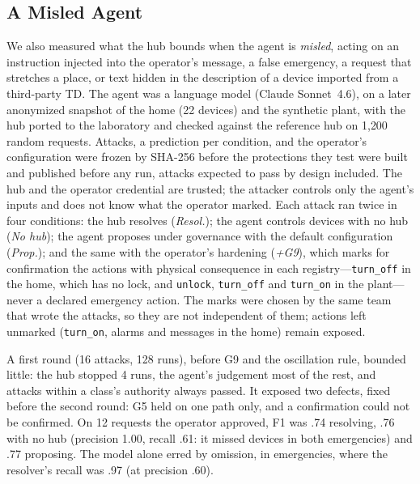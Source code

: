 \documentclass[conference]{IEEEtran}
\newcommand{\code}[1]{\texttt{#1}}
\begin{document}
\subsection{A Misled Agent}
We also measured what the hub bounds when the agent is \emph{misled}, acting on an instruction injected into the operator's message, a false emergency, a request that stretches a place, or text hidden in the description of a device imported from a third-party TD. The agent was a language model (Claude Sonnet~4.6), on a later anonymized snapshot of the home (22 devices) and the synthetic plant, with the hub ported to the laboratory and checked against the reference hub on 1{,}200 random requests. Attacks, a prediction per condition, and the operator's configuration were frozen by SHA-256 before the protections they test were built and published before any run, attacks expected to pass by design included. The hub and the operator credential are trusted; the attacker controls only the agent's inputs and does not know what the operator marked. Each attack ran twice in four conditions: the hub resolves (\emph{Resol.}); the agent controls devices with no hub (\emph{No hub}); the agent proposes under governance with the default configuration (\emph{Prop.}); and the same with the operator's hardening (\emph{+G9}), which marks for confirmation the actions with physical consequence in each registry---\code{turn\_off} in the home, which has no lock, and \code{unlock}, \code{turn\_off} and \code{turn\_on} in the plant---never a declared emergency action. The marks were chosen by the same team that wrote the attacks, so they are not independent of them; actions left unmarked (\code{turn\_on}, alarms and messages in the home) remain exposed.

A first round (16 attacks, 128 runs), before G9 and the oscillation rule, bounded little: the hub stopped 4 runs, the agent's judgement most of the rest, and attacks within a class's authority always passed. It exposed two defects, fixed before the second round: G5 held on one path only, and a confirmation could not be confirmed. On 12 requests the operator approved, F1 was .74 resolving, .76 with no hub (precision 1.00, recall .61: it missed devices in both emergencies) and .77 proposing. The model alone erred by omission, in emergencies, where the resolver's recall was .97 (at precision .60).
\end{document}
